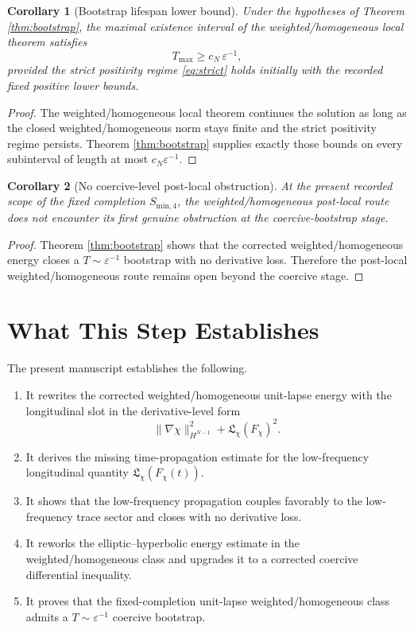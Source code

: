 \documentclass[11pt]{article}
\newtheorem{corollary}{Corollary}
\begin{document}
\begin{corollary}[Bootstrap lifespan lower bound]
\label{cor:lifespan}
Under the hypotheses of Theorem \ref{thm:bootstrap}, the maximal existence interval of the weighted/homogeneous local theorem satisfies
\begin{equation}
T_{\max}\ge c_N\,\varepsilon^{-1},
\label{eq:lifespan}
\end{equation}
provided the strict positivity regime \eqref{eq:strict} holds initially with the recorded fixed positive lower bounds.
\end{corollary}

\begin{proof}
The weighted/homogeneous local theorem continues the solution as long as the closed weighted/homogeneous norm stays finite and the strict positivity regime persists. Theorem \ref{thm:bootstrap} supplies exactly those bounds on every subinterval of length at most \(c_N\varepsilon^{-1}\).
\end{proof}

\begin{corollary}[No coercive-level post-local obstruction]
\label{cor:noobstruction}
At the present recorded scope of the fixed completion \(S_{\mathrm{min},4}\), the weighted/homogeneous post-local route does not encounter its first genuine obstruction at the coercive-bootstrap stage.
\end{corollary}

\begin{proof}
Theorem \ref{thm:bootstrap} shows that the corrected weighted/homogeneous energy closes a \(T\sim \varepsilon^{-1}\) bootstrap with no derivative loss. Therefore the post-local weighted/homogeneous route remains open beyond the coercive stage.
\end{proof}

\section{What This Step Establishes}

The present manuscript establishes the following.
\begin{enumerate}
    \item It rewrites the corrected weighted/homogeneous unit-lapse energy with the longitudinal slot in the derivative-level form
    \[
    \|\nabla\chi\|_{H^{N-1}}^2 + \mathfrak L_\chi(F_\chi)^2.
    \]
    \item It derives the missing time-propagation estimate for the low-frequency longitudinal quantity \(\mathfrak L_\chi(F_\chi(t))\).
    \item It shows that the low-frequency propagation couples favorably to the low-frequency trace sector and closes with no derivative loss.
    \item It reworks the elliptic--hyperbolic energy estimate in the weighted/homogeneous class and upgrades it to a corrected coercive differential inequality.
    \item It proves that the fixed-completion unit-lapse weighted/homogeneous class admits a \(T\sim \varepsilon^{-1}\) coercive bootstrap.
\end{enumerate}
\end{document}
